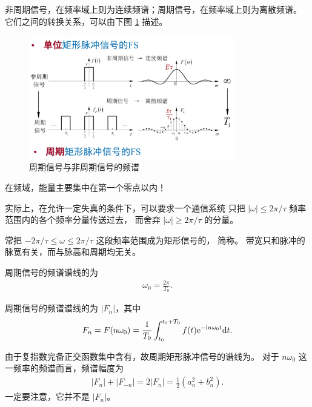 \begin{remark}
    非周期信号，在频率域上则为连续频谱；周期信号，在频率域上则为离散频谱。
    它们之间的转换关系，可以由下图 \ref{fig:periodic-nonperiodic-signal} 描述。
    \begin{figure}[H]
        \centering
        \includegraphics[width = 0.8\textwidth]{chap2/img/periodic-nonperiodic-signal.png}
        \caption{周期信号与非周期信号的频谱}
        \label{fig:periodic-nonperiodic-signal}
    \end{figure}
\end{remark}

\begin{property}[周期矩形脉冲信号的特点]
    在频域，能量主要集中在第一个零点以内！

    实际上，在允许一定失真的条件下，可以要求一个通信系统
    只把 $|\omega| \le 2\pi/\tau$ 频率范围内的各个频率分量传送过去，
    而舍弃 $|\omega| \ge 2\pi/\tau$ 的分量。

    常把 $-2\pi/\tau \le \omega \le 2\pi/\tau$ 这段频率范围成为矩形信号的，
    简称。
    带宽只和脉冲的脉宽有关，而与脉高和周期均无关。
\end{property}

\begin{property}[周期信号的频谱谱线的特点]
    周期信号的频谱谱线的为
    \begin{align*}
        \omega_0 = \frac{2\pi}{T_0}.
    \end{align*}
    
    周期信号的频谱谱线的为 $|F_n|$，其中
    \begin{align*}
        F_n = F(n\omega_0) = \frac{1}{T_0}\int_{t_0}^{t_0 + T_0}f(t)\mathrm{e}^{-\mathrm{i} n\omega_0 t}\mathrm{d}t.
    \end{align*}
\end{property}

\begin{note}
    由于复指数完备正交函数集中含有，故周期矩形脉冲信号的谱线为。
    对于 $n\omega_0$ 这一频率的频谱而言，频谱幅度为
    \begin{align*}
        |F_n| + |F_{-n}| = 2|F_n| = \frac{1}{2}\left(a_n^2 + b_n^2\right).
    \end{align*}
    一定要注意，它并不是 $|F_n|$。
\end{note}

